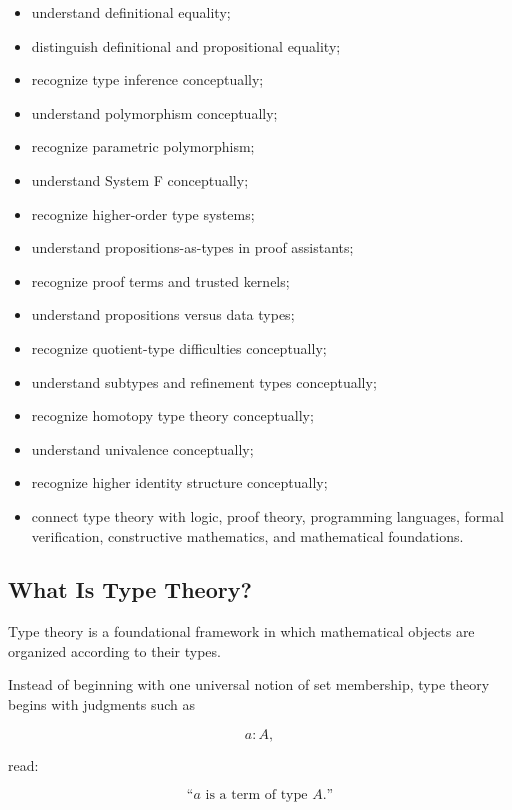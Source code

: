 {\begin{itemize}
    \item understand definitional equality;
    \item distinguish definitional and propositional equality;
    \item recognize type inference conceptually;
    \item understand polymorphism conceptually;
    \item recognize parametric polymorphism;
    \item understand System F conceptually;
    \item recognize higher-order type systems;
    \item understand propositions-as-types in proof assistants;
    \item recognize proof terms and trusted kernels;
    \item understand propositions versus data types;
    \item recognize quotient-type difficulties conceptually;
    \item understand subtypes and refinement types conceptually;
    \item recognize homotopy type theory conceptually;
    \item understand univalence conceptually;
    \item recognize higher identity structure conceptually;
    \item connect type theory with logic, proof theory, programming
          languages, formal verification, constructive mathematics, and
          mathematical foundations.
\end{itemize}
}

\subsection{What Is Type Theory?}
\label{subsec:what-is-type-theory}

Type theory is a foundational framework in which mathematical objects are
organized according to their types.

Instead of beginning with one universal notion of set membership, type
theory begins with judgments such as

\[
\boxed{
a:A,
}
\]

read:

\[
\boxed{
\text{``\(a\) is a term of type \(A\).''}
}
\]

